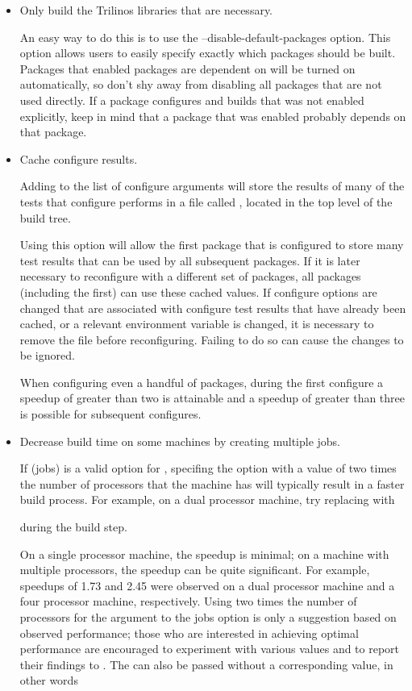 \begin{itemize}
\item Only build the Trilinos libraries that are necessary.

An easy way to do this is to use the --disable-default-packages option.
This option allows users to easily specify exactly which packages should be
built.  Packages that enabled
packages are dependent on will be turned on automatically, so
don't shy away from disabling all packages that are not used directly.
If a package configures and builds that was not enabled explicitly,
keep in mind that a package that was enabled probably depends on that package.

\item Cache configure results.

Adding
to the list of configure arguments will store the results of many of the tests
that configure performs in a file called ,
located in the top level of the build tree.

Using this option will allow the first package that is configured to store
many test results that can be used by all subsequent packages.  If it is
later necessary to reconfigure with a different set of packages, all packages
(including the first) can use these cached values.  If configure options are
changed that are associated with configure test results that have already
been cached, or a relevant environment variable is changed, it is necessary
to remove the
 file before reconfiguring.  Failing to do so
can cause the changes to be ignored.

When configuring even a handful of
packages, during the first configure a speedup of greater
than two is attainable and a speedup of greater than three is possible for
subsequent configures.

\item Decrease build time on some machines by creating multiple jobs.

If  (jobs) is a valid option for ,
specifing the  option with a value of two times the number
of processors that the machine has will typically result in a faster build
process.  For example, on a dual processor machine, try replacing
 with


during the build step.

On a single processor machine, the speedup is minimal; on a machine with
multiple processors, the speedup can be quite significant.  For example,
speedups of 1.73 and 2.45 were observed on a dual processor machine and a four
processor machine, respectively.  Using two times the number of processors for
the argument to the jobs option is only a suggestion based on observed
performance; those who are interested in achieving optimal performance are
encouraged to experiment with various values and to report
their findings to .  The
 can also be passed without a corresponding value, in other
words


\end{itemize}
